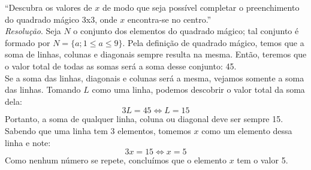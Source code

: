 \enquote{Descubra os valores de $x$ de modo que seja possível completar o preenchimento do quadrado mágico 3x3, onde $x$ encontra-se no centro.} 
\\ \emph{Resolução}. Seja $N$ o conjunto dos elementos do quadrado mágico; tal conjunto é formado por $N = \{a; 1 \le a \le 9\}$. Pela definição de quadrado mágico, temos que a soma de linhas, colunas e diagonais sempre resulta na mesma. Então, teremos que o valor total de todas as somas será a soma desse conjunto: 45. 
\\ Se a soma das linhas, diagonais e colunas será a mesma, vejamos somente a soma das linhas. Tomando $L$ como uma linha, podemos descobrir o valor total da soma dela:
\begin{displaymath}
    3L = 45 \iff L = 15 
\end{displaymath}
Portanto, a soma de qualquer linha, coluna ou diagonal deve ser sempre 15. 
\\ Sabendo que uma linha tem 3 elementos, tomemos $x$ como um elemento dessa linha e note:
\begin{displaymath}
    3x = 15 \iff x = 5
\end{displaymath}
Como nenhum número se repete, concluímos que o elemento $x$ tem o valor 5.